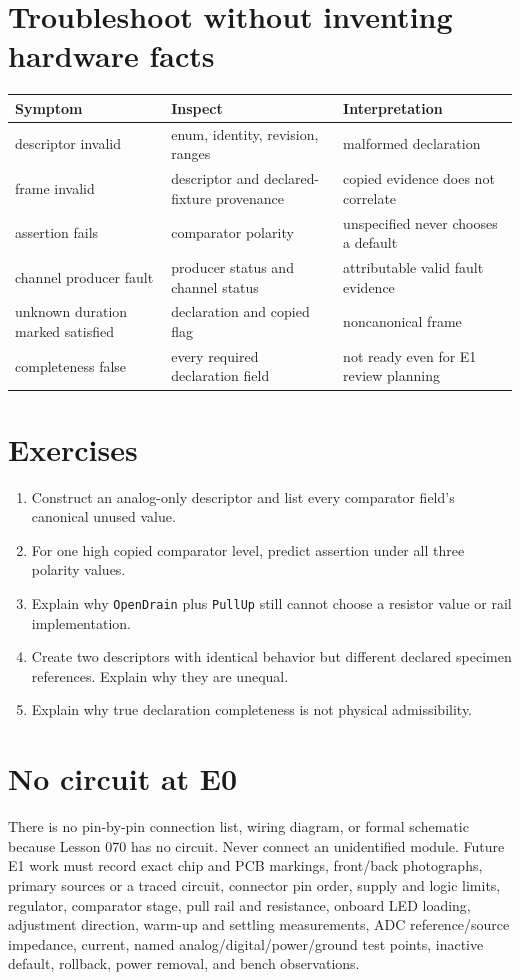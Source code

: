 \documentclass[10pt]{article}
\begin{document}
\newpage
\section{Troubleshoot without inventing hardware facts}
\begin{tabularx}{\linewidth}{@{}l X X@{}}
\toprule
Symptom & Inspect & Interpretation\\
\midrule
descriptor invalid & enum, identity, revision, ranges & malformed declaration\\
frame invalid & descriptor and declared-fixture provenance & copied evidence does not correlate\\
assertion fails & comparator polarity & unspecified never chooses a default\\
channel producer fault & producer status and channel status & attributable valid fault evidence\\
unknown duration marked satisfied & declaration and copied flag & noncanonical frame\\
completeness false & every required declaration field & not ready even for E1 review planning\\
\bottomrule
\end{tabularx}

\section{Exercises}
\begin{enumerate}
 \item Construct an analog-only descriptor and list every comparator field's
       canonical unused value.
 \item For one high copied comparator level, predict assertion under all three
       polarity values.
 \item Explain why \texttt{OpenDrain} plus \texttt{PullUp} still cannot choose
       a resistor value or rail implementation.
 \item Create two descriptors with identical behavior but different declared
       specimen references. Explain why they are unequal.
 \item Explain why true declaration completeness is not physical admissibility.
\end{enumerate}

\section{No circuit at E0}
There is no pin-by-pin connection list, wiring diagram, or formal schematic
because Lesson 070 has no circuit. Never connect an unidentified module.
Future E1 work must record exact chip and PCB markings, front/back photographs,
primary sources or a traced circuit, connector pin order, supply and logic
limits, regulator, comparator stage, pull rail and resistance, onboard LED
loading, adjustment direction, warm-up and settling measurements, ADC
reference/source impedance, current, named analog/digital/power/ground test
points, inactive default, rollback, power removal, and bench observations.
\end{document}
